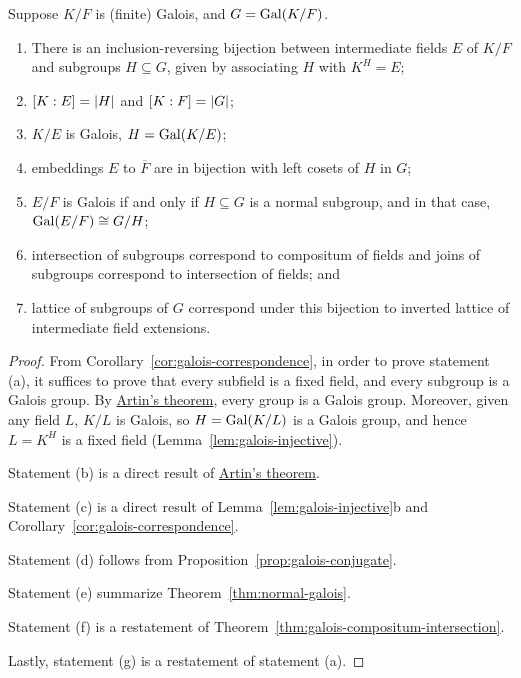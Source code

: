 \begin{theorem}\label{thm:ftgt}
    Suppose \(K/F\) is (finite) Galois, and \(G = \operatorname{Gal}(K/F)\).
    \begin{enumerate}[label={(\alph*)}, itemsep=0mm]
        \item There is an inclusion-reversing bijection
            between intermediate fields \(E\) of \(K/F\) and subgroups \(H \subseteq G\),
            given by associating \(H\) with \(K^H = E\);
        \item \([K:E] = \abs{H}\) and \([K:F] = \abs{G}\);
        \item \(K/E\) is Galois, \(H = \operatorname{Gal}(K/E)\);
        \item embeddings \(E\) to \(\overline{F}\) are in bijection with
            left cosets of \(H\) in \(G\);
        \item \(E/F\) is Galois if and only if \(H \subseteq G\) is a normal subgroup,
            and in that case, \(\operatorname{Gal}(E/F) \cong G/H\);
        \item intersection of subgroups correspond to compositum of fields
            and joins of subgroups correspond to intersection of fields; and
        \item lattice of subgroups of \(G\) correspond under this bijection
            to inverted lattice of intermediate field extensions.
    \end{enumerate}
\end{theorem}
\begin{proof}
    From Corollary~\ref{cor:galois-correspondence}, in order to prove statement (a),
    it suffices to prove that every subfield is a fixed field,
    and every subgroup is a Galois group.
    By \hyperref[thm:artin-galois]{Artin's theorem}, every group is a Galois group.
    Moreover, given any field \(L\), \(K/L\) is Galois,
    so \(H = \operatorname{Gal}(K/L)\) is a Galois group, and hence \(L = K^H\) is a fixed field
    (Lemma~\ref{lem:galois-injective}).

    Statement (b) is a direct result of \hyperref[thm:artin-galois]{Artin's theorem}.

    Statement (c) is a direct result of Lemma~\ref{lem:galois-injective}b and Corollary~\ref{cor:galois-correspondence}.

    Statement (d) follows from Proposition~\ref{prop:galois-conjugate}.
    
    Statement (e) summarize Theorem~\ref{thm:normal-galois}.

    Statement (f) is a restatement of Theorem~\ref{thm:galois-compositum-intersection}.

    Lastly, statement (g) is a restatement of statement (a).
\end{proof}

